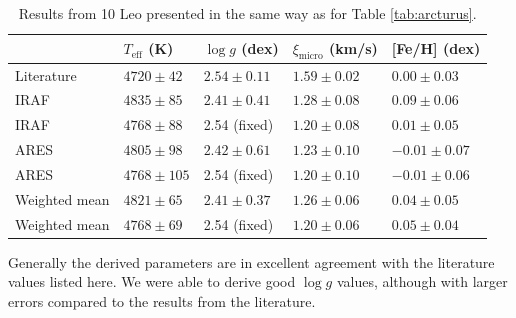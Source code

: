 \documentclass{aa}
\begin{document}
\begin{table}[htb!]
    \caption{Results from 10 Leo presented in the same way as for
             Table \ref{tab:arcturus}.}
    \label{tab:10Leo}
    \centering
    \begin{tabular}{lllll}
      \hline\hline
                      & $T_\mathrm{eff}$ (K) &  $\log g$ (dex)  &   $\xi_\mathrm{micro}$ (km/s)   & [Fe/H] (dex)     \\
      \hline
        Literature    & $4720 \pm  42$       &  $2.54 \pm 0.11$ &    $1.59 \pm 0.02$              & $ 0.00 \pm 0.03$ \\
      \hline
        IRAF          & $4835 \pm  85$       &  $2.41 \pm 0.41$ &    $1.28 \pm 0.08$              & $ 0.09 \pm 0.06$ \\
        IRAF          & $4768 \pm  88$       &   2.54 (fixed)   &    $1.20 \pm 0.08$              & $ 0.01 \pm 0.05$ \\
      \hline
        ARES          & $4805 \pm  98$       &  $2.42 \pm 0.61$ &    $1.23 \pm 0.10$              & $-0.01 \pm 0.07$ \\
        ARES          & $4768 \pm 105$       &   2.54 (fixed)   &    $1.20 \pm 0.10$              & $-0.01 \pm 0.06$ \\
      \hline
        Weighted mean & $4821 \pm  65$       &  $2.41 \pm 0.37$ &    $1.26 \pm 0.06$              & $ 0.04 \pm 0.05$ \\
        Weighted mean & $4768 \pm  69$       &   2.54 (fixed)   &    $1.20 \pm 0.06$              & $ 0.05 \pm 0.04$ \\
      \hline
    \end{tabular}
\end{table}

Generally the derived parameters are in excellent agreement with the literature
values listed here. We were able to derive good $\log g$ values, although with
larger errors compared to the results from the literature.
\end{document}
